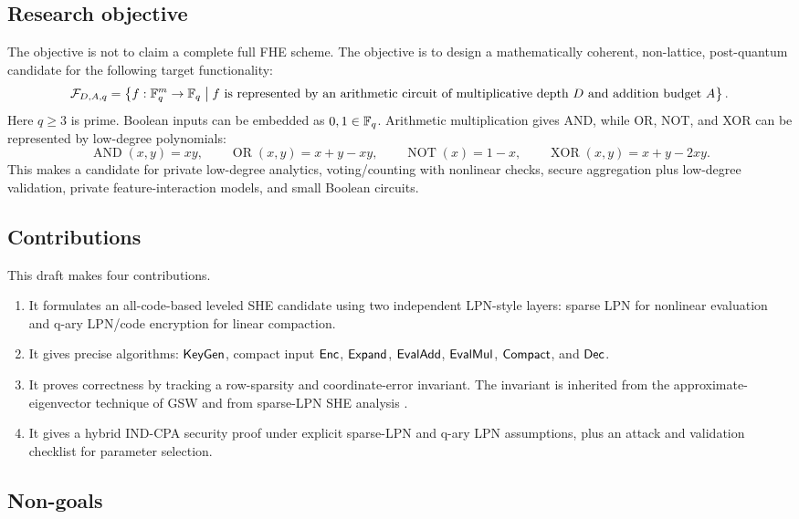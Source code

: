\subsection{Research objective}

The objective is not to claim a complete full FHE scheme.  The objective is to design a mathematically coherent, non-lattice, post-quantum candidate for the following target functionality:
\[
\mathcal{F}_{D,A,q} =
\left\{
 f:\mathbb{F}_q^m\to\mathbb{F}_q
 \;\middle|\;
 f \text{ is represented by an arithmetic circuit of multiplicative depth }D
 \text{ and addition budget }A
\right\}.
\]
Here $q\ge 3$ is prime.  Boolean inputs can be embedded as $0,1\in\mathbb{F}_q$.  Arithmetic multiplication gives AND, while OR, NOT, and XOR can be represented by low-degree polynomials:
\[
\operatorname{AND}(x,y)=xy,
\qquad
\operatorname{OR}(x,y)=x+y-xy,
\qquad
\operatorname{NOT}(x)=1-x,
\qquad
\operatorname{XOR}(x,y)=x+y-2xy.
\]
This makes \sable{} a candidate for private low-degree analytics, voting/counting with nonlinear checks, secure aggregation plus low-degree validation, private feature-interaction models, and small Boolean circuits.

\subsection{Contributions}

This draft makes four contributions.

\begin{enumerate}
    \item It formulates an all-code-based leveled SHE candidate using two independent LPN-style layers: sparse LPN for nonlinear evaluation and q-ary LPN/code encryption for linear compaction.
    \item It gives precise algorithms: $\mathsf{KeyGen}$, compact input $\mathsf{Enc}$, $\mathsf{Expand}$, $\mathsf{EvalAdd}$, $\mathsf{EvalMul}$, $\mathsf{Compact}$, and $\mathsf{Dec}$.
    \item It proves correctness by tracking a row-sparsity and coordinate-error invariant.  The invariant is inherited from the approximate-eigenvector technique of GSW and from sparse-LPN SHE analysis \cite{GSW2013,CorriganGibbsHenzingerKalaiVaikuntanathan2024}.
    \item It gives a hybrid IND-CPA security proof under explicit sparse-LPN and q-ary LPN assumptions, plus an attack and validation checklist for parameter selection.
\end{enumerate}

\subsection{Non-goals}

